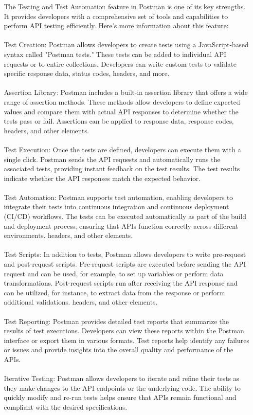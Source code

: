 \documentclass[twoside,twocolumn]{article}
\begin{document}
The Testing and Test Automation feature in Postman is one of its key strengths. It provides developers with a comprehensive set of tools and capabilities to perform API testing efficiently. Here's more information about this feature:
\\ \\
Test Creation: Postman allows developers to create tests using a JavaScript-based syntax called "Postman tests." These tests can be added to individual API requests or to entire collections. Developers can write custom tests to validate specific response data, status codes, headers, and more.
\\ \\
Assertion Library: Postman includes a built-in assertion library that offers a wide range of assertion methods. These methods allow developers to define expected values and compare them with actual API responses to determine whether the tests pass or fail. Assertions can be applied to response data, response codes, headers, and other elements.
\\ \\
Test Execution: Once the tests are defined, developers can execute them with a single click. Postman sends the API requests and automatically runs the associated tests, providing instant feedback on the test results. The test results indicate whether the API responses match the expected behavior.
\\ \\
Test Automation: Postman supports test automation, enabling developers to integrate their tests into continuous integration and continuous deployment (CI/CD) workflows. The tests can be executed automatically as part of the build and deployment process, ensuring that APIs function correctly across different environments.
headers, and other elements.
\\ \\
Test Scripts: In addition to tests, Postman allows developers to write pre-request and post-request scripts. Pre-request scripts are executed before sending the API request and can be used, for example, to set up variables or perform data transformations. Post-request scripts run after receiving the API response and can be utilized, for instance, to extract data from the response or perform additional validations.
headers, and other elements.
\\ \\
Test Reporting: Postman provides detailed test reports that summarize the results of test executions. Developers can view these reports within the Postman interface or export them in various formats. Test reports help identify any failures or issues and provide insights into the overall quality and performance of the APIs.
\\ \\
Iterative Testing: Postman allows developers to iterate and refine their tests as they make changes to the API endpoints or the underlying code. The ability to quickly modify and re-run tests helps ensure that APIs remain functional and compliant with the desired specifications.
\end{document}

